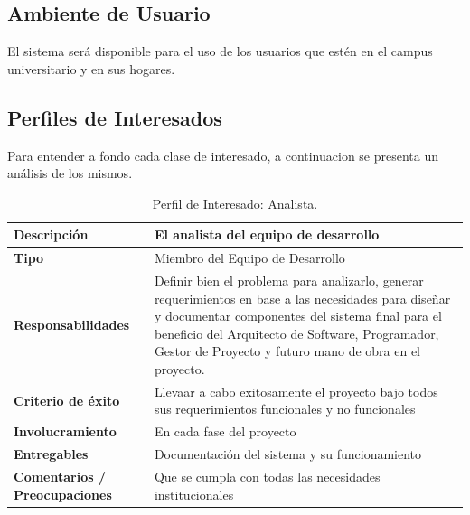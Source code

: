 \subsection{Ambiente de Usuario}
El sistema será disponible para el uso de los usuarios que estén en el campus universitario y en sus hogares.

\subsection{Perfiles de Interesados}
Para entender a fondo cada clase de interesado, a continuacion se presenta un análisis de los mismos.

\pagebreak

\begin{table}[h!]
  \begin{tabular}{|p{}|p{}|}
    \hline
    \textbf{Descripción} & El analista del equipo de desarrollo \\
    \hline
    \textbf{Tipo} & Miembro del Equipo de Desarrollo \\
    \hline
    \textbf{Responsabilidades} & Definir bien el problema para analizarlo, generar requerimientos en base a las necesidades para diseñar y documentar componentes del sistema final para el beneficio del Arquitecto de Software, Programador, Gestor de Proyecto y futuro mano de obra en el proyecto. \\
    \hline
    \textbf{Criterio de éxito} & Llevaar a cabo exitosamente el proyecto bajo todos sus requerimientos funcionales y no funcionales \\
    \hline
    \textbf{Involucramiento} & En cada fase del proyecto \\
    \hline
    \textbf{Entregables} & Documentación del sistema y su funcionamiento \\
    \hline
    \textbf{Comentarios / Preocupaciones} & Que se cumpla con todas las necesidades institucionales \\
    \hline
  \end{tabular}
  \caption{Perfil de Interesado: Analista.}
  \label{per-inter-analista}
\end{table}

\vfill

